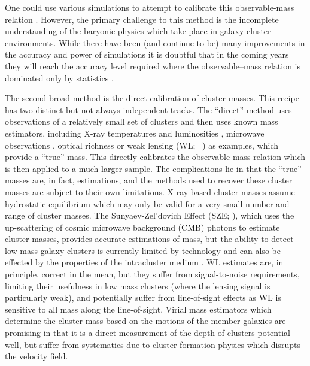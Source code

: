 One could use various simulations to attempt to calibrate this observable-mass relation . However, the primary challenge to this method is the incomplete understanding of the baryonic physics which take place in galaxy cluster environments. While there have been (and continue to be) many improvements in the accuracy and power of simulations it is doubtful that in the coming years they will reach the accuracy level required where the observable--mass relation is dominated only by statistics \citep{Weinberg2013}. 
 
The second broad method is the direct calibration of cluster masses. This recipe has two distinct but not always independent tracks. The ``direct'' method uses observations of a relatively small set of clusters and then uses known mass estimators, including X-ray temperatures and luminosities , microwave observations , optical richness  or weak lensing (WL; \eg\ \citealt{Rozo2010}) as examples, which provide a ``true'' mass. This directly calibrates the observable-mass relation which is then applied to a much larger sample. The complications lie in that the ``true'' masses are, in fact, estimations, and the methods used to recover these cluster masses are subject to their own limitations. X-ray based cluster masses assume hydrostatic equilibrium  which may only be valid for a very small number and range of cluster masses. The Sunyaev-Zel'dovich Effect (SZE; \citealt{Sunyaev1972}), which uses the up-scattering of cosmic microwave background (CMB) photons to estimate cluster masses, provides accurate estimations of mass, but the ability to detect low mass galaxy clusters is currently limited by technology  and can also be effected by the properties of the intracluster medium . WL estimates are, in principle, correct in the mean, but they suffer from signal-to-noise requirements, limiting their usefulness in low mass clusters (where the lensing signal is particularly weak), and potentially suffer from line-of-sight effects as WL is sensitive to all mass along the line-of-sight. Virial mass estimators which determine the cluster mass based on the motions of the member galaxies  are promising in that it is a direct measurement of the depth of clusters potential well, but suffer from systematics due to cluster formation physics which disrupts the velocity field.
 
